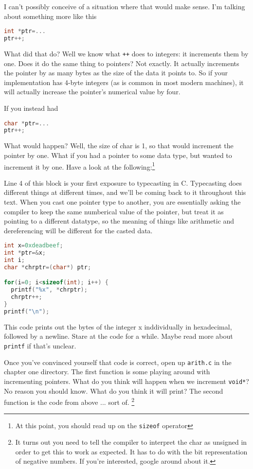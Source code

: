 \documentclass[ebook,11pt,oneside,openany]{memoir}
\begin{document}
I can't possibly conceive of a situation where that would make sense. I'm talking about something more like this


\begin{lstlisting}[language=C]
int *ptr=...
ptr++;
\end{lstlisting}

What did that do? Well we know what \texttt{++} does to integers: it increments them by one. Does it do the same thing to pointers? Not exactly. It actually increments the pointer by as many bytes as the size of the data it points to. So if your implementation has 4-byte integers (as is common in most modern machines), it will actually increase the pointer's numerical value by four.

If you instead had 

\begin{lstlisting}[language=C]
char *ptr=...
ptr++;
\end{lstlisting}

What would happen? Well, the size of char is 1, so that would increment the pointer by one. What if you had a pointer to some data type, but wanted to increment it by one. Have a look at the following:\footnote{At this point, you should read up on the \texttt{sizeof} operator}

Line 4 of this block is your first exposure to typecasting in C. Typecasting does different things at different times, and we'll be coming back to it throughout this text. When you cast one pointer type to another, you are essentially asking the compiler to keep the same numberical value of the pointer, but treat it as pointing to a different datatype, so the meaning of things like arithmetic and dereferencing will be different for the casted data.

\begin{lstlisting}[language=C]
int x=0xdeadbeef;
int *ptr=&x;
int i;
char *chrptr=(char*) ptr;

for(i=0; i<sizeof(int); i++) {
  printf("%x", *chrptr);
  chrptr++;
}
printf("\n");
\end{lstlisting}


This code prints out the bytes of the integer x inddividually in hexadecimal, followed by a newline.  Stare at the code for a while. Maybe read more about \texttt{printf} if that's unclear.

Once you've convinced yourself that code is correct, open up \texttt{arith.c} in the chapter one directory. The first function is some playing around with incrementing pointers. What do you think will happen when we increment \texttt{void*}? No reason you should know. What do you think it will print? The second function is the code from above ... sort of. \footnote{It turns out you need to tell the compiler to interpret the char as unsigned in order to get this to work as expected. It has to do with the bit representation of negative numbers. If you're interested, google around about it.}
\end{document}
